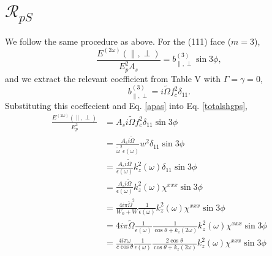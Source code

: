 \section{\texorpdfstring{$\mathcal{R}_{pS}$}{RpS}}
We follow the same procedure as above. For the (111) face ($m = 3$),
\begin{equation}\label{totalshgps}%
\frac{E^{(2\omega)}(\parallel,\perp)}{E^{2}_{p}A_{s}} 
= b^{(3)}_{\parallel,\perp}\sin3\phi,
\end{equation}
and we extract the relevant coefficient from Table V with $\Gamma=\gamma=0$,
\begin{equation*}
b^{(3)}_{\parallel,\perp} = i\tilde{\Omega}f^{2}_{c}\delta_{11}.
\end{equation*}
Substituting this coeffecient and Eq. \eqref{apas} into Eq. \eqref{totalshgps},
\begin{equation*}
\begin{split}
\frac{E^{(2\omega)}(\parallel,\perp)}{E^{2}_{p}}
&= A_{s}i\tilde{\Omega}f^{2}_{c}\delta_{11}\sin3\phi\\
&= \frac{A_{s}i\tilde{\Omega}}{\tilde{\omega}^{2}\epsilon(\omega)}
    w^{2}\delta_{11}\sin3\phi\\
&= \frac{A_{s}i\tilde{\Omega}}{\epsilon(\omega)}
    k^{2}_{z}(\omega)\delta_{11}\sin3\phi\\
&= \frac{A_{s}i\tilde{\Omega}}{\epsilon(\omega)}
    k^{2}_{z}(\omega)\chi^{xxx}\sin3\phi\\
&= \frac{4i\pi\tilde{\Omega}^{2}}{W_{0} + W}
   \frac{1}{\epsilon(\omega)}k^{2}_{z}(\omega)\chi^{xxx}\sin3\phi\\
&= 4i\pi\tilde{\Omega}\frac{1}{\epsilon(\omega)}
   \frac{1}{\cos\theta + k_{z}(2\omega)}k^{2}_{z}(\omega)\chi^{xxx}\sin3\phi\\
&= \frac{4i\pi\omega}{c\cos\theta}
   \frac{1}{\epsilon(\omega)}
   \frac{2\cos\theta}{\cos\theta + k_{z}(2\omega)}
   k^{2}_{z}(\omega)\chi^{xxx}\sin3\phi
\end{split}
\end{equation*}

